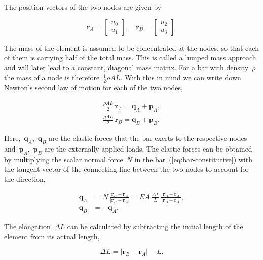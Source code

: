 The position vectors of the two nodes are given by

\begin{equation}
\boldsymbol{r}_A =
\begin{bmatrix} u_0 \\ u_1 \end{bmatrix}, \quad
\boldsymbol{r}_B =
\begin{bmatrix} u_2 \\ u_3 \end{bmatrix}.\label{bar:node-positions}
\end{equation}

The mass of the element is assumed to be concentrated at the nodes, so that each of them is carrying half of the total mass.
This is called a lumped mass approach and will later lead to a constant, diagonal mass matrix.
For a bar with density~$\rho$ the mass of a node is therefore~$\frac{1}{2}\rho A L$. With this in mind we can write down Newton's second law of motion for each of the two nodes,

\begin{align}
\frac{\rho A L}{2}\,\ddot{\boldsymbol{r}}_A = \boldsymbol{q}_A + \boldsymbol{p}_A,\label{eq:bar-newton-1}\\
\frac{\rho A L}{2}\,\ddot{\boldsymbol{r}}_B = \boldsymbol{q}_B + \boldsymbol{p}_B.\label{eq:bar-newton-2}
\end{align}

Here,~$\boldsymbol{q}_A$,~$\boldsymbol{q}_B$ are the elastic forces that the bar exerts to the respective nodes and~$\boldsymbol{p}_A$,~$\boldsymbol{p}_B$ are the externally applied loads. The elastic forces can be obtained by multiplying the scalar normal force~$N$ in the bar~(\ref{eq:bar-constitutive}) with the tangent vector of the connecting line between the two nodes to account for the direction,

\begin{align}
\boldsymbol{q}_A &= N\,\frac{\boldsymbol{r}_B - \boldsymbol{r}_A}{|\boldsymbol{r}_B - \boldsymbol{r}_A|} = EA\,\frac{\Delta L}{L}\, \frac{\boldsymbol{r}_B - \boldsymbol{r}_A}{|\boldsymbol{r}_B - \boldsymbol{r}_A|},\label{eq:bar-elastic-1}\\
\boldsymbol{q}_B &= -\boldsymbol{q}_A.\label{eq:bar-elastic-2}
\end{align}

The elongation~$\Delta L$ can be calculated by subtracting the initial length of the element from its actual length,

\begin{equation}
\Delta L = |\boldsymbol{r}_B - \boldsymbol{r}_A| - L.\label{eq:bar-elongation}
\end{equation}

